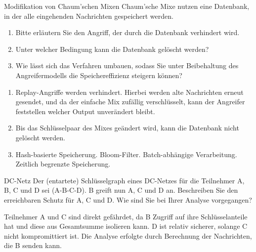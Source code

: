 \documentclass{article}
\begin{document}
\setcounter{subsection}{235}
\begin{exercise}{Modifikation von Chaum'schen Mixen}
  Chaum'sche Mixe nutzen eine Datenbank, in der alle eingehenden Nachrichten gespeichert werden.
  \begin{enumerate}
    \item Bitte erläutern Sie den Angriff, der durch die Datenbank verhindert wird.
    \item Unter welcher Bedingung kann die Datenbank gelöscht werden?
    \item Wie lässt sich das Verfahren umbauen, sodass Sie unter Beibehaltung des Angreifermodells die Speichereffizienz steigern können?
  \end{enumerate}

  \begin{solution}
    \begin{enumerate}
      \item Replay-Angriffe werden verhindert. Hierbei werden alte Nachrichten erneut gesendet, und da der einfache Mix zufällig verschlüsselt, kann der Angreifer feststellen welcher Output unverändert bleibt.
      \item Bis das Schlüsselpaar des Mixes geändert wird, kann die Datenbank nicht gelöscht werden.
      \item Hash-basierte Speicherung. Bloom-Filter. Batch-abhängige Verarbeitung. Zeitlich begrenzte Speicherung.
    \end{enumerate}
  \end{solution}
\end{exercise}

\begin{exercise}{DC-Netz}
  Der (entartete) Schlüsselgraph eines DC-Netzes für die Teilnehmer A, B, C und D sei (A-B-C-D). B greift nun A, C und D an. Beschreiben Sie den erreichbaren Schutz für A, C und D. Wie sind Sie bei Ihrer Analyse vorgegangen?

  \begin{solution}
    Teilnehmer A und C sind direkt gefährdet, da B Zugriff auf ihre Schlüsselanteile hat und diese aus Gesamtsumme isolieren kann. D ist relativ sicherer, solange C nicht kompromittiert ist. Die Analyse erfolgte durch Berechnung der Nachrichten, die B senden kann.
  \end{solution}
\end{exercise}
\end{document}
